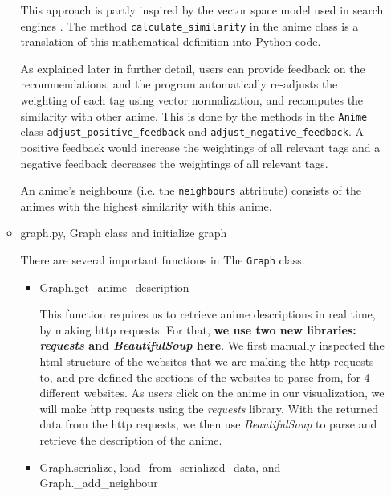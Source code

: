 \documentclass[12pt]{article}
\begin{document}
\begin{enumerate}
\begin{text}
\begin{itemize}
    This approach is partly inspired by the vector space model used in search engines \citep{vspace}. The method \texttt{calculate\_similarity} in the anime class is a translation of this mathematical definition into Python code.
    
    As explained later in further detail, users can provide feedback on the recommendations, and the program automatically re-adjusts the weighting of each tag using vector normalization, and recomputes the similarity with other anime. This is done by the methods in the \texttt{Anime} class \texttt{adjust\_positive\_feedback} and \texttt{adjust\_negative\_feedback}. A positive feedback would increase the weightings of all relevant tags and a negative feedback decreases the weightings of all relevant tags.
    
    An anime's neighbours (i.e. the \texttt{neighbours} attribute) consists of the animes with the highest similarity with this anime.
    
    \item graph.py, Graph class and initialize graph

    There are several important functions in The \texttt{Graph} class.
    
    \begin{itemize}
        \item Graph.get\_anime\_description
        
            This function requires us to retrieve anime descriptions in real time, by making http requests. For that, \textbf{we use two new libraries: \textit{requests} and \textit{BeautifulSoup} here}. We first manually inspected the html structure of the websites that we are making the http requests to, and pre-defined the sections of the websites to parse from, for 4 different websites. As users click on the anime in our visualization, we will make http requests using the \textit{requests} library. With the returned data from the http requests, we then use \textit{BeautifulSoup} to parse and retrieve the description of the anime.
            
        \item Graph.serialize, load\_from\_serialized\_data, and Graph.\_add\_neighbour
        

\end{itemize}
\end{itemize}
\end{text}
\end{enumerate}
\end{document}
